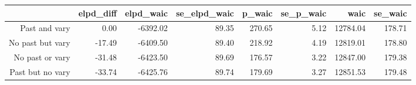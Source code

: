 \begin{table}[ht]
\centering
\begin{tabular}{rrrrrrrr}
  \hline
 & elpd\_diff & elpd\_waic & se\_elpd\_waic & p\_waic & se\_p\_waic & waic & se\_waic \\ 
  \hline
Past and vary & 0.00 & -6392.02 & 89.35 & 270.65 & 5.12 & 12784.04 & 178.71 \\ 
  No past but vary & -17.49 & -6409.50 & 89.40 & 218.92 & 4.19 & 12819.01 & 178.80 \\ 
  No past or vary & -31.48 & -6423.50 & 89.69 & 176.57 & 3.22 & 12847.00 & 179.38 \\ 
  Past but no vary & -33.74 & -6425.76 & 89.74 & 179.69 & 3.27 & 12851.53 & 179.48 \\ 
   \hline
\end{tabular}
\end{table}

